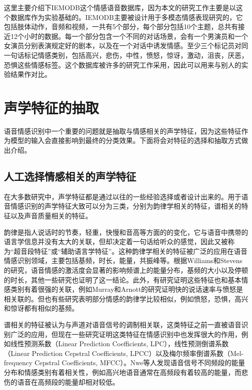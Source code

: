 
这里主要介绍下IEMODB这个情感语音数据库，因为本文的研究工作主要是以这个数据库作为实验基础的。IEMODB主要被设计用于多模态情感表现研究的，它包括肢体动作，音频和视频，一共有5个部分，每个部分包括10个主题，总共有接近12个小时的数据。每一个部分包含一个不同的对话场景，会有一个男演员和一个女演员分别表演规定好的剧本，以及在一个对话中诱发情感。至少三个标记员对同一句话标记情感类别，包括高兴，悲伤，中性，愤怒，惊讶，激动，沮丧，厌恶，恐惧这些情感标签。这个数据库被许多的研究工作采用，因此可以用来与别人的实验结果作对比。

\section{声学特征的抽取}
\label{sec:acoustic_feature_extract}
语音情感识别中一个重要的问题就是抽取与情感相关的声学特征，因为这些特征作为模型的输入会直接影响到最终的分类效果。下面将会对特征的选择和抽取方式做出介绍。

\subsection{人工选择情感相关的声学特征}
\label{ssec:artifical_select}
在大多数研究中，声学特征都是通过以往的一些经验选择或者设计出来的。用于语音情感识别的声学特征大致可以分为三类，分别为韵律学相关的特征，谱相关的特征以及声音质量相关的特征。

韵律是指人说话时的节奏，轻重，快慢和音高等方面的的变化，它与语音中携带的语言学信息并没有太大的关联，但却决定着一句话给听众的感觉，因此又被称为“超音段特征”或“辅助语言学特征”。这种韵律学相关的特征被广泛的应用在语音情感识别领域，主要包括基频，时长，能量，共振峰等。根据Williams和Stevens的研究，语音情感的激活度会显著的影响频谱上的能量分布，基频的大小以及停顿的时长，其他一些研究也证明了这一结论。此外，有研究证明这些特征也和基本情感类别有着很强的关联，例如Murray和Arnott的研究证明快的说话速率与愤怒是相关联的。但也有些研究表明部分情感的韵律学比较相似，例如愤怒，恐惧，高兴和惊讶都有相似的基频。

谱相关的特征被认为与声道对语音信号的调制相关联，这类特征之前一直被语音识别广泛的应用，但现在一些研究证明这类特征在情感识别中也发挥很大的作用，例如线性预测系数（Linear Prediction Coefficients, LPC），线性预测倒谱系数（Linear Prediction Cepstral Coefficients, LPCC）以及梅尔频率倒谱系数（Mel-frequency Cepstral Coefficients, MFCC）。Nwe等人发现语音信号不同频段的能量分布和情感类别有着相关性，例如高兴地语音通常在高频段有着较高的能量，而悲伤的语音在高频段的能量却相对较低。

